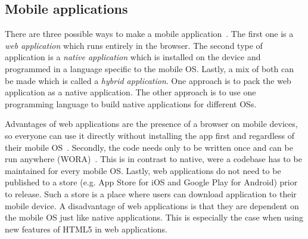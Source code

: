 \documentclass[a4paper]{artikel3}
\begin{document}
\begin{table}[t]
\centering
{}
\quad
{}
\caption{Usage of iOS versions on May 8, 2013 and Android versions on May 1, 2013 \protect\cite{Smith2013,Android2013}.}
\label{table:mos-versions}
\end{table}

\subsection{Mobile applications}
There are three possible ways to make a mobile application~\cite{Accenture2012,Hales2012}.
The first one is a \emph{web application} which runs entirely in the browser.
The second type of application is a \emph{native application} which is installed on the device and programmed in a language specific to the mobile OS.
Lastly, a mix of both can be made which is called a \emph{hybrid application}.
One approach is to pack the web application as a native application.
The other approach is to use one programming language to build native applications for different OSs.

Advantages of web applications are the presence of a browser on mobile devices, so everyone can use it directly without installing the app first and regardless of their mobile OS~\cite{Accenture2012}.
Secondly, the code needs only to be written once and can be run anywhere (WORA)~\cite{Hales2012}.
This is in contrast to native, were a codebase has to be maintained for every mobile OS.
Lastly, web applications do not need to be published to a store (e.g. App Store for iOS and Google Play for Android) prior to release.
Such a store is a place where users can download application to their mobile device.
A disadvantage of web applications is that they are dependent on the mobile OS just like native applications.
This is especially the case when using new features of HTML5 in web applications.
\end{document}
